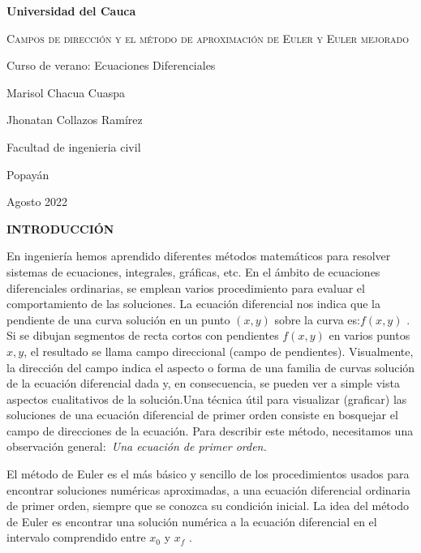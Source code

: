 \documentclass[12 pt,letterpaper]{article}
\author{Marisol Chacua Cuaspa}
\begin{document}
	
	
	\begin{titlepage}
		\centering
		
		\vspace{1cm}
		{\bfseries\LARGE Universidad del Cauca \par}
		\vspace{5cm}
		
		{\scshape\Large Campos de direcci\'on y el m\'etodo de aproximaci\'on de Euler y Euler mejorado\par}
		\vspace{3cm}
		{\Large Curso de verano: Ecuaciones Diferenciales\par}
		\vfill
		{\Large Marisol Chacua Cuaspa \par}
		\vfill
		{\Large Jhonatan Collazos Ramírez \par}
		\vfill
        {\Large Facultad de ingenieria civil\par}
		{\Large Popayán\par}
	    {\Large Agosto 2022\par}
	\end{titlepage}
	
	\centering
	\textbf{\LARGE{INTRODUCCI\'ON }}
	
	
	\justify 
   En ingeniería hemos aprendido diferentes métodos matemáticos para resolver sistemas de ecuaciones, integrales, gráficas, etc. En el ámbito de ecuaciones diferenciales ordinarias, se emplean varios procedimiento para evaluar el comportamiento de las soluciones. La ecuación diferencial nos indica que la pendiente de una curva solución en un punto {$(x, y)$} sobre la curva es:{$ f(x, y)$}  . Si se dibujan segmentos de recta cortos con pendientes {$ f(x, y)$} en varios puntos  {$x, y$}, el resultado se llama campo direccional (campo de pendientes). Visualmente, la dirección del campo indica el aspecto o forma de una familia de curvas solución de la ecuación diferencial dada y, en consecuencia, se pueden ver a simple vista aspectos cualitativos de la solución.Una técnica útil para visualizar (graficar) las soluciones de una ecuación diferencial de primer orden consiste en bosquejar el campo de direcciones de la ecuación. Para describir este método, necesitamos una observación general:{\itshape\ Una ecuación de primer orden.}\vspace{0.4Cm}
 
	El método de Euler es el más básico y sencillo de los procedimientos usados para encontrar soluciones numéricas aproximadas, a una ecuación diferencial ordinaria de primer orden, siempre que se conozca su condición inicial. La idea del método de Euler es encontrar una solución numérica a la ecuación diferencial en el intervalo comprendido entre {$x_{0} $} y {$x_{f} $} .	\vspace{0.4Cm}
\end{document}
